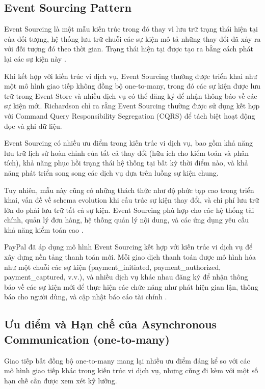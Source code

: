 \subsection{Event Sourcing Pattern}
Event Sourcing là một mẫu kiến trúc trong đó thay vì lưu trữ trạng thái hiện tại của đối tượng, hệ thống lưu trữ chuỗi các sự kiện mô tả những thay đổi đã xảy ra với đối tượng đó theo thời gian. Trạng thái hiện tại được tạo ra bằng cách phát lại các sự kiện này \cite{fowler2002}.

Khi kết hợp với kiến trúc vi dịch vụ, Event Sourcing thường được triển khai như một mô hình giao tiếp không đồng bộ one-to-many, trong đó các sự kiện được lưu trữ trong Event Store và nhiều dịch vụ có thể đăng ký để nhận thông báo về các sự kiện mới. Richardson \cite{richardson2019} chỉ ra rằng Event Sourcing thường được sử dụng kết hợp với Command Query Responsibility Segregation (CQRS) để tách biệt hoạt động đọc và ghi dữ liệu.

Event Sourcing có nhiều ưu điểm trong kiến trúc vi dịch vụ, bao gồm khả năng lưu trữ lịch sử hoàn chỉnh của tất cả thay đổi (hữu ích cho kiểm toán và phân tích), khả năng phục hồi trạng thái hệ thống tại bất kỳ thời điểm nào, và khả năng phát triển song song các dịch vụ dựa trên luồng sự kiện chung.

Tuy nhiên, mẫu này cũng có những thách thức như độ phức tạp cao trong triển khai, vấn đề về schema evolution khi cấu trúc sự kiện thay đổi, và chi phí lưu trữ lớn do phải lưu trữ tất cả sự kiện. Event Sourcing phù hợp cho các hệ thống tài chính, quản lý đơn hàng, hệ thống quản lý nội dung, và các ứng dụng yêu cầu khả năng kiểm toán cao \cite{richardson2019}.

PayPal đã áp dụng mô hình Event Sourcing kết hợp với kiến trúc vi dịch vụ để xây dựng nền tảng thanh toán mới. Mỗi giao dịch thanh toán được mô hình hóa như một chuỗi các sự kiện (payment\_initiated, payment\_authorized, payment\_captured, v.v.), và nhiều dịch vụ khác nhau đăng ký để nhận thông báo về các sự kiện mới để thực hiện các chức năng như phát hiện gian lận, thông báo cho người dùng, và cập nhật báo cáo tài chính \cite{raman2016}.

\subsection{Ưu điểm và Hạn chế của Asynchronous Communication (one-to-many)}
Giao tiếp bất đồng bộ one-to-many mang lại nhiều ưu điểm đáng kể so với các mô hình giao tiếp khác trong kiến trúc vi dịch vụ, nhưng cũng đi kèm với một số hạn chế cần được xem xét kỹ lưỡng.

